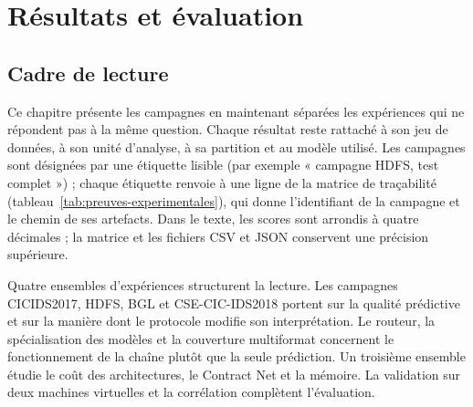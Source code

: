 \chapter{Résultats et évaluation}

\label{chap:resultats}

\section{Cadre de lecture}

Ce chapitre présente les campagnes en maintenant séparées les expériences qui ne répondent pas à la même question. Chaque résultat reste rattaché à son jeu de données, à son unité d’analyse, à sa partition et au modèle utilisé. Les campagnes sont désignées par une étiquette lisible (par exemple « campagne HDFS, test complet ») ; chaque étiquette renvoie à une ligne de la matrice de traçabilité (tableau~\ref{tab:preuves-experimentales}), qui donne l'identifiant de la campagne et le chemin de ses artefacts. Dans le texte, les scores sont arrondis à quatre décimales ; la matrice et les fichiers CSV et JSON conservent une précision supérieure.

Quatre ensembles d’expériences structurent la lecture. Les campagnes CICIDS2017, HDFS, BGL et CSE-CIC-IDS2018 portent sur la qualité prédictive et sur la manière dont le protocole modifie son interprétation. Le routeur, la spécialisation des modèles et la couverture multiformat concernent le fonctionnement de la chaîne plutôt que la seule prédiction. Un troisième ensemble étudie le coût des architectures, le Contract Net et la mémoire. La validation sur deux machines virtuelles et la corrélation complètent l’évaluation.

